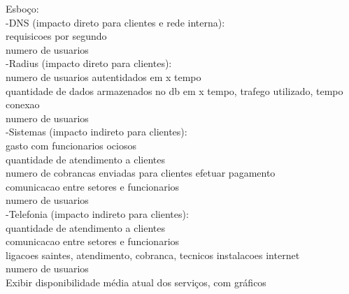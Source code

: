Esboço: \\
-DNS (impacto direto para clientes e rede interna): \\
requisicoes por segundo\\
numero de usuarios\\
-Radius (impacto direto para clientes): \\
numero de usuarios autentidados em x tempo\\
quantidade de dados armazenados no db em x tempo, trafego utilizado, tempo conexao\\
numero de usuarios\\
-Sistemas (impacto indireto para clientes): \\
gasto com funcionarios ociosos\\
quantidade de atendimento a clientes\\
numero de cobrancas enviadas para clientes efetuar pagamento\\
comunicacao entre setores e funcionarios\\
numero de usuarios\\
-Telefonia (impacto indireto para clientes): \\
quantidade de atendimento a clientes\\
comunicacao entre setores e funcionarios\\
ligacoes saintes, atendimento, cobranca, tecnicos instalacoes internet\\
numero de usuarios\\

Exibir disponibilidade média atual dos serviços, com gráficos



